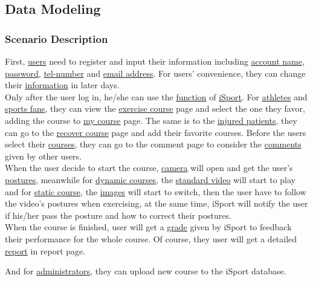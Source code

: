 \documentclass[16pt]{scrreprt}
\begin{document}
\subsection{Data Modeling}
\subsubsection{Scenario Description}
First, \underline{users} need to register and input their information including \underline{account name}, \underline{password}, \underline{tel-number} and \underline{email address}. For users’ convenience, they can change their \underline{information} in later days.\\
\noindent Only after the user log in, he/she can use the \underline{function} of \underline{iSport}. For \underline{athletes} and \underline{sports fans}, they can view the \underline{exercise course} page and select the one they favor, adding the course to \underline{my course} page. The same is to the \underline{injured patients}, they can go to the \underline{recover course} page and add their favorite courses. Before the users select their \underline{courses}, they can go to the comment page to consider the \underline{comments} given by other users. \\
\noindent When the user decide to start the course, \underline{camera} will open and get the user’s \underline{postures}, meanwhile for \underline{dynamic courses}, the \underline{standard video} will start to play and for \underline{static course}, the \underline{images} will start to switch, then the user have to follow the video’s postures when exercising, at the same time, iSport will notify the user if his/her pass the posture and how to correct their postures. \\
\noindent When the course is finished, user will get a \underline{grade} given by iSport to feedback their performance for the whole course. Of course, they user will get a detailed \underline{report} in report page.

\noindent And for \underline{administrators}, they can upload new course to the iSport database.
\end{document}
